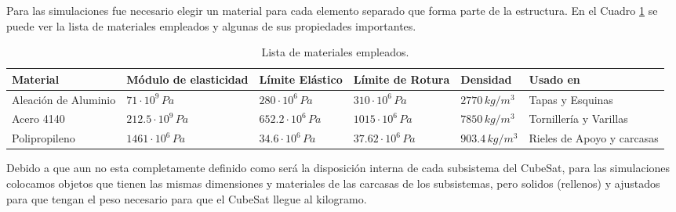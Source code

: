     Para las simulaciones fue necesario elegir un material para cada elemento separado que forma parte de la estructura.
    En el Cuadro \ref{tab:materiales_empleados} se puede ver la lista de materiales empleados y algunas de sus
    propiedades importantes.

    \begin{table}[H]
    \centering
    \small
    \begin{tabular}{|p{2.2cm}|p{2.3cm}|p{2.3cm}|p{2.5cm}|p{2cm}|p{2.5cm}|}
    \hline
    \textbf{Material} & \centering\textbf{Módulo de elasticidad} & \centering\textbf{Límite Elástico} & \centering\textbf{Límite de Rotura} & \centering\textbf{Densidad} & \centering\textbf{Usado en} \tabularnewline
    \hline
    Aleación de Aluminio & \centering $71 \cdot 10^9\,Pa$ & \centering $280 \cdot 10^6\,Pa$ & \centering $310 \cdot 10^6\,Pa$ & \centering $2770\,kg/m^3$ & Tapas y Esquinas \tabularnewline
    \hline
    Acero 4140 & \centering $212.5 \cdot 10^9\,Pa$ & \centering $652.2 \cdot 10^6\,Pa$ & \centering $1015 \cdot 10^6\,Pa$ & \centering $7850\,kg/m^3$ & Tornillería y Varillas \tabularnewline
    \hline
    Polipropileno & \centering $1461 \cdot 10^6\,Pa$ & \centering $34.6 \cdot 10^6\,Pa$ & \centering $37.62 \cdot 10^6\,Pa$ & \centering $903.4\,kg/m^3$ & Rieles de Apoyo y carcasas \tabularnewline
    \hline
    \end{tabular}
    \caption{Lista de materiales empleados.}
    \label{tab:materiales_empleados}
    \end{table}

    Debido a que aun no esta completamente definido como será la disposición interna de cada subsistema del CubeSat,
    para las simulaciones colocamos objetos que tienen las mismas dimensiones y materiales de las carcasas de los
    subsistemas, pero solidos (rellenos) y ajustados para que tengan el peso necesario para que el CubeSat llegue al
    kilogramo.

